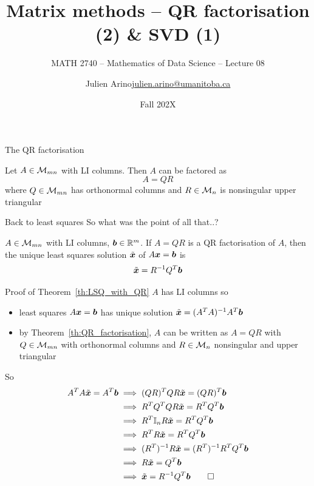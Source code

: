 \documentclass[aspectratio=169]{beamer}\usepackage[]{graphicx}\usepackage[]{xcolor}
\subtitle{MATH 2740 -- Mathematics of Data Science -- Lecture 08}
\author{\texorpdfstring{Julien Arino\newline\url{julien.arino@umanitoba.ca}}{Julien Arino}}
\institute{Department of Mathematics @ University of Manitoba}
\date{Fall 202X}
\title{Matrix methods -- QR factorisation (2) \& SVD (1)}
\begin{document}
\setcounter{theorem}{69}




\begin{frame}{The QR factorisation}
\begin{importanttheorem}\label{th:QR_factorisation}
Let $A\in\mathcal{M}_{mn}$ with LI columns. Then $A$ can be factored as
\[
A=QR
\]
where $Q\in\mathcal{M}_{mn}$ has orthonormal columns and $R\in\mathcal{M}_n$ is nonsingular upper triangular
\end{importanttheorem}
\end{frame}


\begin{frame}{Back to least squares}
So what was the point of all that..?
\vfill
\begin{importanttheorem}
\label{th:LSQ_with_QR}
$A\in\mathcal{M}_{mn}$ with LI columns, $\bm{b}\in\mathbb{R}^m$. If $A=QR$ is a QR factorisation of $A$, then the unique least squares solution $\tilde{\bm{x}}$ of $A\bm{x}=\bm{b}$ is
\[
\tilde{\bm{x}} = R^{-1}Q^T\bm{b}
\]
\end{importanttheorem}
\end{frame}


\begin{frame}{Proof of Theorem~\ref{th:LSQ_with_QR}}
$A$ has LI columns so 
\begin{itemize}
\item least squares $A\bm{x}=\bm{b}$ has unique solution $\tilde{\bm{x}}=(A^TA)^{-1}A^T\bm{b}$
\item by Theorem~\ref{th:QR_factorisation}, $A$ can be written as $A=QR$ with $Q\in\mathcal{M}_{mn}$ with orthonormal columns and $R\in\mathcal{M}_n$ nonsingular and upper triangular
\end{itemize}
So
\begin{align*}
A^TA\tilde\bx= A^T\bb &\implies (QR)^TQR\tilde\bx = (QR)^T\bb \\
&\implies R^TQ^TQR\tilde\bx = R^TQ^T\bb \\
&\implies R^T\II_nR\tilde\bx = R^TQ^T\bb \\
&\implies R^TR\tilde\bx = R^TQ^T\bb \\
&\implies (R^T)^{-1}R\tilde\bx = (R^T)^{-1}R^TQ^T\bb \\
&\implies R\tilde\bx = Q^T\bb \\
&\implies \tilde\bx = R^{-1}Q^T\bb\hfill\qed
\end{align*}
\end{frame}
\end{document}
